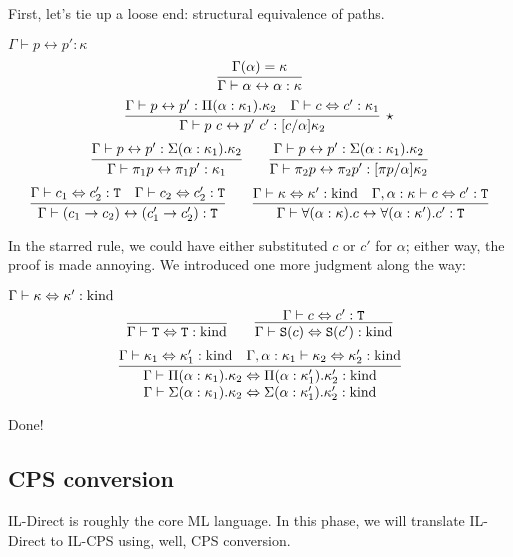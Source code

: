 
First, let's tie up a loose end: structural equivalence of paths.

\begin{judgment}
  $\Gamma \vdash  p \leftrightarrow p' : \kappa$
  \[
    \infer{\Gamma \vdash \alpha \leftrightarrow \alpha : \kappa}
      {\Gamma(\alpha) = \kappa}
  \]
  \[
    \infer[\star]{\Gamma \vdash p~c \leftrightarrow p'~c' : [c/\alpha]\kappa_2}
      {\Gamma \vdash p \leftrightarrow p' : \Pi(\alpha : \kappa_1).\kappa_2
      &\Gamma \vdash c \Leftrightarrow c' : \kappa_1
      }
  \]
  \[
    \infer{\Gamma \vdash \pi_1 p \leftrightarrow \pi_1 p' : \kappa_1}
      {\Gamma \vdash p \leftrightarrow p' : \Sigma(\alpha : \kappa_1).\kappa_2}
    \qquad
    \infer{\Gamma \vdash \pi_2p \leftrightarrow \pi_2p' : [\pi p/\alpha]\kappa_2}
      {\Gamma \vdash p \leftrightarrow p' : \Sigma(\alpha : \kappa_1).\kappa_2}
  \]
  \[ \infer{\Gamma \vdash (c_1 \rightarrow c_2) \leftrightarrow (c_1' \rightarrow c_2') : \T}
      {\Gamma \vdash c_1 \Leftrightarrow c_2' : \T
      &\Gamma \vdash c_2 \Leftrightarrow c_2' : \T
      }
    \qquad
    \infer{\Gamma \vdash \forall(\alpha : \kappa).c \leftrightarrow
            \forall(\alpha : \kappa').c' : \T}
      {\Gamma \vdash \kappa \Leftrightarrow \kappa' : \kind
      &\Gamma, \alpha : \kappa \vdash c \Leftrightarrow c' : \T
      }
  \]
\end{judgment}
In the starred rule, we could have either substituted $c$ or $c'$ for $\alpha$; either
way, the proof is made annoying. We introduced one more judgment along the way:
\begin{judgment}
  $\Gamma \vdash \kappa \Leftrightarrow \kappa' : \textnormal{kind}$
  \[
    \infer{\Gamma \vdash \T \Leftrightarrow \T : \kind}{}
    \qquad
    \infer{\Gamma \vdash \S(c) \Leftrightarrow \S(c') : \kind}
      {\Gamma \vdash c \Leftrightarrow c' : \T}
  \]
  \[
    \infer
      {\deduce
        {\Gamma \vdash \Sigma(\alpha : \kappa_1).\kappa_2 \Leftrightarrow
          \Sigma(\alpha : \kappa_1').\kappa_2' : \kind}
        {\Gamma \vdash \Pi(\alpha : \kappa_1).\kappa_2 \Leftrightarrow
          \Pi(\alpha : \kappa_1').\kappa_2' : \kind}
      }
      {\Gamma \vdash \kappa_1 \Leftrightarrow \kappa_1' : \kind
      &\Gamma, \alpha : \kappa_1 \vdash \kappa_2 \Leftrightarrow \kappa_2' : \kind
      }
  \]
\end{judgment}
Done!

\subsection{CPS conversion}
IL-Direct is roughly the core ML language. In this phase, we will translate IL-Direct
to IL-CPS using, well, CPS conversion.


